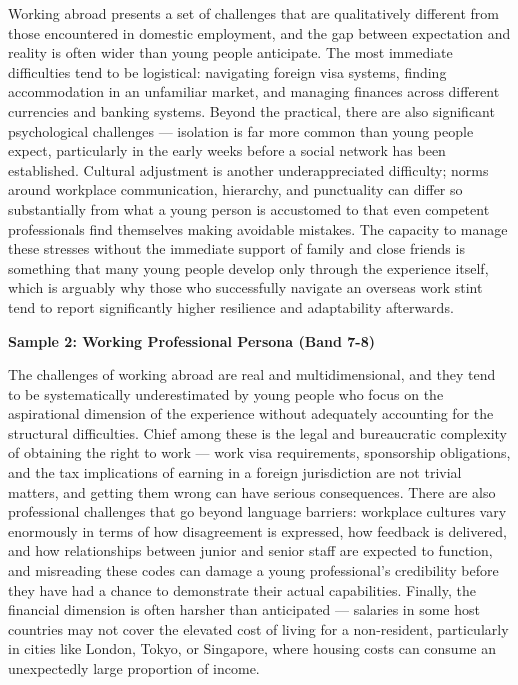 Working abroad presents a set of challenges that are qualitatively different from those encountered in domestic employment, and the gap between expectation and reality is often wider than young people anticipate. The most immediate difficulties tend to be logistical: navigating foreign visa systems, finding accommodation in an unfamiliar market, and managing finances across different currencies and banking systems. Beyond the practical, there are also significant psychological challenges — isolation is far more common than young people expect, particularly in the early weeks before a social network has been established. Cultural adjustment is another underappreciated difficulty; norms around workplace communication, hierarchy, and punctuality can differ so substantially from what a young person is accustomed to that even competent professionals find themselves making avoidable mistakes. The capacity to manage these stresses without the immediate support of family and close friends is something that many young people develop only through the experience itself, which is arguably why those who successfully navigate an overseas work stint tend to report significantly higher resilience and adaptability afterwards.

\textbf{Sample 2: Working Professional Persona (Band 7-8)}

The challenges of working abroad are real and multidimensional, and they tend to be systematically underestimated by young people who focus on the aspirational dimension of the experience without adequately accounting for the structural difficulties. Chief among these is the legal and bureaucratic complexity of obtaining the right to work — work visa requirements, sponsorship obligations, and the tax implications of earning in a foreign jurisdiction are not trivial matters, and getting them wrong can have serious consequences. There are also professional challenges that go beyond language barriers: workplace cultures vary enormously in terms of how disagreement is expressed, how feedback is delivered, and how relationships between junior and senior staff are expected to function, and misreading these codes can damage a young professional's credibility before they have had a chance to demonstrate their actual capabilities. Finally, the financial dimension is often harsher than anticipated — salaries in some host countries may not cover the elevated cost of living for a non-resident, particularly in cities like London, Tokyo, or Singapore, where housing costs can consume an unexpectedly large proportion of income.

